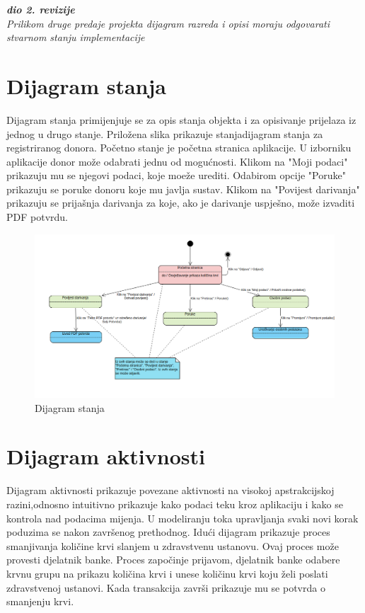 			\textbf{\textit{dio 2. revizije}}\\			
			
			\textit{Prilikom druge predaje projekta dijagram razreda i opisi moraju odgovarati stvarnom stanju implementacije}
			
			
			
			\eject
		
		\section{Dijagram stanja}
			Dijagram stanja primijenjuje se za opis stanja objekta i za opisivanje prijelaza iz jednog u drugo stanje. Priložena slika prikazuje stanjadijagram stanja za registriranog donora. Početno stanje je početna stranica aplikacije. U izborniku aplikacije donor može odabrati jednu od mogućnosti. Klikom na "Moji podaci" prikazuju mu se njegovi podaci, koje moeže urediti. Odabirom opcije "Poruke" prikazuju se poruke donoru koje mu javlja sustav. Klikom na 
"Povijest darivanja" prikazuju se prijašnja darivanja za koje, ako je darivanje uspješno,  može izvaditi PDF potvrdu.

\begin{figure}[H]
	\centering
	\includegraphics[width=\textwidth, scale=0.7]{dijagrami/dijagram_stanja}
	\caption{Dijagram stanja}
	\label{fig:dijagram_stanja}
\end{figure}
			
			
			
			
			\eject 
		
		\section{Dijagram aktivnosti}
			Dijagram aktivnosti prikazuje povezane aktivnosti na visokoj apstrakcijskoj razini,odnosno intuitivno prikazuje kako podaci teku kroz aplikaciju i kako se
kontrola nad podacima mijenja. U modeliranju toka upravljanja svaki novi korak poduzima se nakon završenog prethodnog. Idući dijagram prikazuje proces smanjivanja količine krvi slanjem u zdravstvenu ustanovu. Ovaj proces može provesti djelatnik banke. Proces započinje prijavom, djelatnik banke odabere krvnu grupu na prikazu količina krvi i unese količinu krvi koju želi poslati zdravstvenoj ustanovi. Kada transakcija završi prikazuje mu se potvrda o smanjenju krvi.
		
